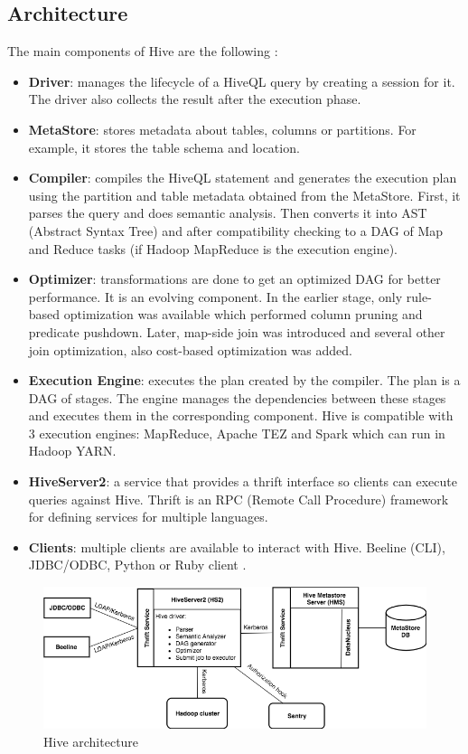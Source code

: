 \subsection{Architecture}
The main components of Hive are the following \cite{Hive-paper}:
\begin{itemize}
	\item \textbf{Driver}: manages the lifecycle of a HiveQL query by creating a session for it. The driver also collects the result after the execution phase.
	\item  \textbf{MetaStore}: stores metadata about tables, columns or partitions. For example, it stores the table schema and location.
	\item \textbf{Compiler}: compiles the HiveQL statement and generates the execution plan using the partition and table metadata obtained from the MetaStore. First, it parses the query and does semantic analysis. Then converts it into AST (Abstract Syntax Tree) and after compatibility checking to a DAG of Map and Reduce tasks (if Hadoop MapReduce is the execution engine). 
	\item \textbf{Optimizer}: transformations are done to get an optimized DAG for better performance. It is an evolving component. In the earlier stage, only rule-based optimization was available which performed column pruning and predicate pushdown. Later, map-side join was introduced and several other join optimization, also cost-based optimization was added.
	\item \textbf{Execution Engine}: executes the plan created by the compiler. The plan is a DAG of stages. The engine manages the dependencies between these stages and executes them in the corresponding component. Hive is compatible with 3 execution engines: MapReduce, Apache TEZ and Spark which can run in Hadoop YARN.
	\item \textbf{HiveServer2}: a service that provides a thrift interface so clients can execute queries against Hive. Thrift is an RPC (Remote Call Procedure) framework for defining services for multiple languages.
	\item \textbf{Clients}: multiple clients are available to interact with Hive. Beeline (CLI), JDBC/ODBC, Python or Ruby client \etc.
\end{itemize}

\begin{figure}[H]
	\includegraphics[width=150mm, keepaspectratio]{figures/Hive_architecture.png}
	\centering
	\caption*{Hive architecture}
\end{figure}

